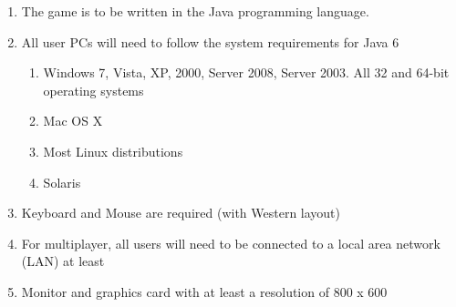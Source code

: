\begin{enumerate}
	\item The game is to be written in the Java programming language.
	\item All user PCs will need to follow the system requirements for Java 6
	\begin{enumerate}
	\item Windows 7, Vista, XP, 2000, Server 2008, Server 2003. All 32 and 64-bit operating systems
	\item Mac OS X
	\item Most Linux distributions
	\item Solaris
	\end{enumerate}
\item Keyboard and Mouse are required (with Western layout)
\item For multiplayer, all users will need to be connected to a local area network (LAN) at least
\item Monitor and graphics card with at least a resolution of 800 x 600 
\end{enumerate}

